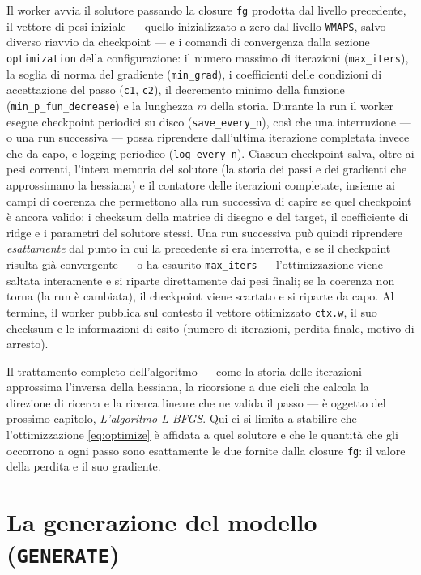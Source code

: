 Il worker avvia il solutore passando la closure \texttt{fg} prodotta dal
livello precedente, il vettore di pesi iniziale — quello inizializzato a
zero dal livello \texttt{WMAPS}, salvo diverso riavvio da checkpoint — e i
comandi di convergenza
dalla sezione \texttt{optimization} della configurazione: il numero massimo di
iterazioni (\texttt{max\_iters}), la soglia di norma del gradiente
(\texttt{min\_grad}), i coefficienti delle condizioni di accettazione del
passo (\texttt{c1}, \texttt{c2}), il decremento minimo della funzione
(\texttt{min\_p\_fun\_decrease}) e la lunghezza $m$ della storia. Durante la
run il worker esegue checkpoint periodici su disco (\texttt{save\_every\_n}),
così che una interruzione — o una run successiva — possa riprendere
dall'ultima iterazione completata invece che da capo, e logging periodico
(\texttt{log\_every\_n}). Ciascun checkpoint salva, oltre ai pesi correnti,
l'intera memoria del solutore (la storia dei passi e dei gradienti che
approssimano la hessiana) e il contatore delle iterazioni completate, insieme
ai campi di coerenza che permettono alla run successiva di capire se quel
checkpoint è ancora valido: i checksum della matrice di disegno e del
target, il coefficiente di ridge e i parametri del solutore stessi. Una
run successiva può quindi riprendere \emph{esattamente} dal punto in cui la
precedente si era interrotta, e se il checkpoint risulta già convergente — o
ha esaurito \texttt{max\_iters} — l'ottimizzazione viene saltata
interamente e si riparte direttamente dai pesi finali; se la coerenza non
torna (la run è cambiata), il checkpoint viene scartato e si riparte da
capo. Al termine, il worker
pubblica sul contesto il vettore ottimizzato \texttt{ctx.w}, il suo checksum
e le informazioni di esito (numero di iterazioni, perdita finale, motivo di
arresto).

Il trattamento completo dell'algoritmo — come la storia delle iterazioni
approssima l'inversa della hessiana, la ricorsione a due cicli che calcola
la direzione di ricerca e la ricerca lineare che ne valida il passo — è
oggetto del prossimo capitolo, \emph{L'algoritmo L-BFGS}. Qui ci si limita a
stabilire che l'ottimizzazione \eqref{eq:optimize} è affidata a quel solutore
e che le quantità che gli occorrono a ogni passo sono esattamente le due
fornite dalla closure \texttt{fg}: il valore della perdita e il suo gradiente.

\section{La generazione del modello (\texttt{GENERATE})}

